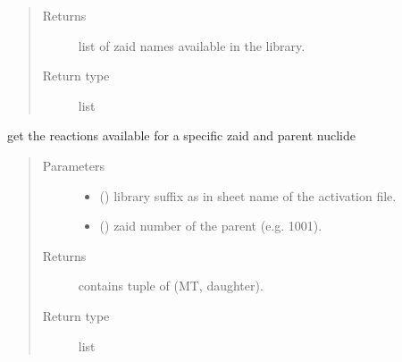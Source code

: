 \documentclass[letterpaper,10pt,english]{sphinxmanual}
\begin{document}
\begin{fulllineitems}
\begin{fulllineitems}
\begin{quote}
\begin{description}
\item[{Returns}] \leavevmode
\sphinxAtStartPar
{} \textendash{} list of zaid names available in the library.

\item[{Return type}] \leavevmode
\sphinxAtStartPar
list

\end{description}\end{quote}

\end{fulllineitems}


\begin{fulllineitems}
\label{\detokenize{api/initobjects:libmanager.LibManager.get_reactions}}
\sphinxAtStartPar
get the reactions available for a specific zaid and parent nuclide
\begin{quote}\begin{description}
\item[{Parameters}] \leavevmode\begin{itemize}
\item {} 
\sphinxAtStartPar
{} () \textendash{} library suffix as in sheet name of the activation file.

\item {} 
\sphinxAtStartPar
{} () \textendash{} zaid number of the parent (e.g. 1001).

\end{itemize}

\item[{Returns}] \leavevmode
\sphinxAtStartPar
{} \textendash{} contains tuple of (MT, daughter).

\item[{Return type}] \leavevmode
\sphinxAtStartPar
list

\end{description}\end{quote}

\end{fulllineitems}



\end{fulllineitems}
\end{document}
